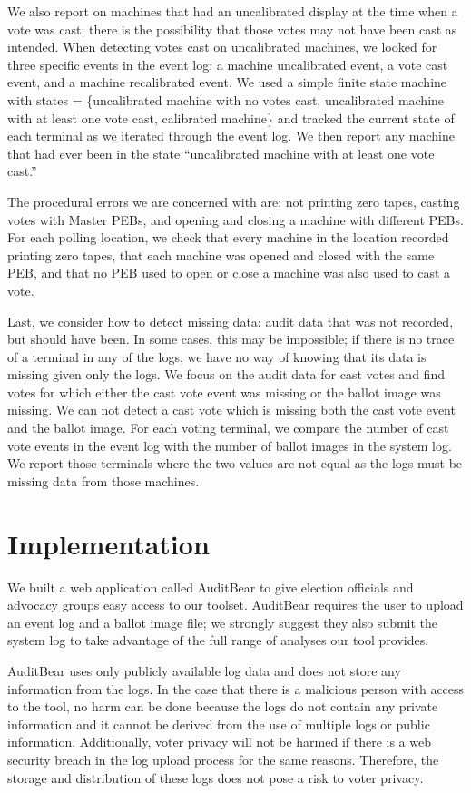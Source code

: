 \documentclass[letterpaper,twocolumn,10pt]{article}
\begin{document}
We also report on machines that had an uncalibrated display at the time when a
vote was cast; there is the possibility that those votes may not have been cast
as intended. When detecting votes cast on uncalibrated machines, we looked for
three specific events in the event log: a machine uncalibrated event, a vote
cast event, and a machine recalibrated event. We used a simple finite state
machine with states = \{uncalibrated machine with no votes cast, uncalibrated
  machine with at least one vote cast, calibrated machine\} and tracked the
current state of each terminal as we iterated through the event log. We then
report any machine that had ever been in the state ``uncalibrated machine with
at least one vote cast.''

The procedural errors we are concerned with are: not printing zero tapes,
casting votes with Master PEBs, and opening and closing a machine with
different PEBs. For each polling location, we check that every machine in the
location recorded printing zero tapes, that each machine was opened and closed
with the same PEB, and that no PEB used to open or close a machine was also used
to cast a vote.

Last, we consider how to detect missing data: audit data that was not recorded,
but should have been. In some cases, this may be impossible; if there is no
trace of a terminal in any of the logs, we have no way of knowing that its data
is missing given only the logs. We focus on the audit data for cast votes and
find votes for which either the cast vote event was missing or the ballot image
was missing. We can not detect a cast vote which is missing both the cast vote
event and the ballot image. For each voting terminal, we compare the number of
cast vote events in the event log with the number of ballot images in the system
log. We report those terminals where the two values are not equal as the logs
must be missing data from those machines.  

\section{Implementation}
We built a web application called AuditBear to give election officials and
advocacy groups easy access to our toolset. AuditBear requires the user to
upload an event log and a ballot image file; we strongly suggest they also
submit the system log to take advantage of the full range of analyses our tool
provides. 

AuditBear uses only publicly available log data and does not store
any information from the logs. In the case that there 
is a malicious person with access to the tool, no harm can be done because the 
logs do not contain any private information and it cannot be derived from the 
use of multiple logs or public information.  Additionally, voter privacy will 
not be harmed if there is a web security breach in the log upload process for 
the same reasons.  Therefore, the storage and distribution of these logs does 
not pose a risk to voter privacy. 
\end{document}
